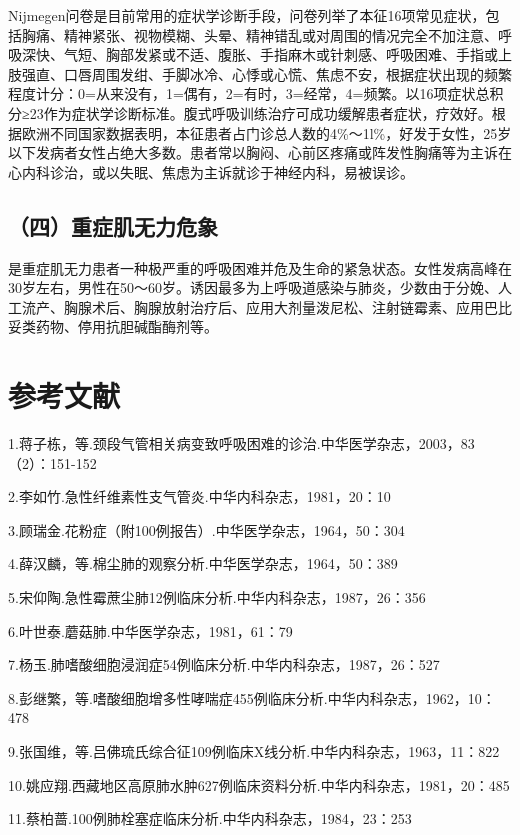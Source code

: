 Nijmegen问卷是目前常用的症状学诊断手段，问卷列举了本征16项常见症状，包括胸痛、精神紧张、视物模糊、头晕、精神错乱或对周围的情况完全不加注意、呼吸深快、气短、胸部发紧或不适、腹胀、手指麻木或针刺感、呼吸困难、手指或上肢强直、口唇周围发绀、手脚冰冷、心悸或心慌、焦虑不安，根据症状出现的频繁程度计分：0=从来没有，1=偶有，2=有时，3=经常，4=频繁。以16项症状总积分≥23作为症状学诊断标准。腹式呼吸训练治疗可成功缓解患者症状，疗效好。根据欧洲不同国家数据表明，本征患者占门诊总人数的4\%～1l\%，好发于女性，25岁以下发病者女性占绝大多数。患者常以胸闷、心前区疼痛或阵发性胸痛等为主诉在心内科诊治，或以失眠、焦虑为主诉就诊于神经内科，易被误诊。

\subsection{（四）重症肌无力危象}

是重症肌无力患者一种极严重的呼吸困难并危及生命的紧急状态。女性发病高峰在30岁左右，男性在50～60岁。诱因最多为上呼吸道感染与肺炎，少数由于分娩、人工流产、胸腺术后、胸腺放射治疗后、应用大剂量泼尼松、注射链霉素、应用巴比妥类药物、停用抗胆碱酯酶剂等。

\protect\hypertarget{text00055.html}{}{}

\section{参考文献}

1.蒋子栋，等.颈段气管相关病变致呼吸困难的诊治.中华医学杂志，2003，83（2）：151-152

2.李如竹.急性纤维素性支气管炎.中华内科杂志，1981，20：10

3.顾瑞金.花粉症（附100例报告）.中华医学杂志，1964，50：304

4.薛汉麟，等.棉尘肺的观察分析.中华医学杂志，1964，50：389

5.宋仰陶.急性霉蔗尘肺12例临床分析.中华内科杂志，1987，26：356

6.叶世泰.蘑菇肺.中华医学杂志，1981，61：79

7.杨玉.肺嗜酸细胞浸润症54例临床分析.中华内科杂志，1987，26：527

8.彭继繁，等.嗜酸细胞增多性哮喘症455例临床分析.中华内科杂志，1962，10：478

9.张国维，等.吕佛琉氏综合征109例临床X线分析.中华内科杂志，1963，11：822

10.姚应翔.西藏地区高原肺水肿627例临床资料分析.中华内科杂志，1981，20：485

11.蔡柏蔷.100例肺栓塞症临床分析.中华内科杂志，1984，23：253

